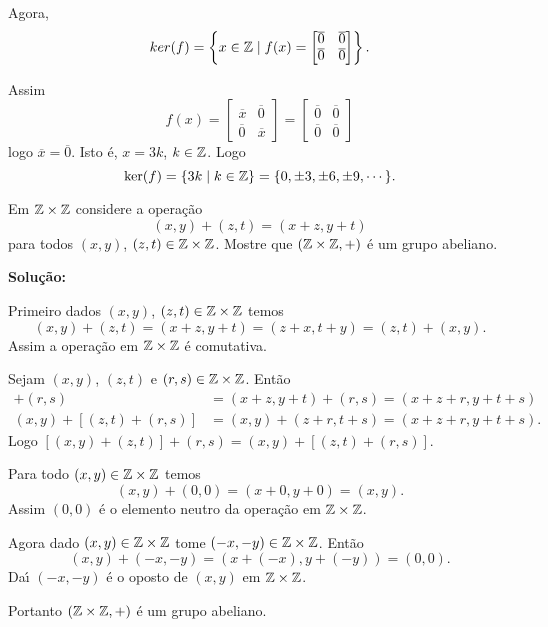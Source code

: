 \documentclass[12pt]{exam}
\begin{document}
Agora,
\[
	ker(f) = \left\{x \in \mathbb{Z} \mid f(x) = \begin{bmatrix}
		\overline{0} & \overline{0}\\
		\overline{0} & \overline{0}
	\end{bmatrix}\right\}.
\]

Assim
\[
	f(x) = \begin{bmatrix}
		\overline{x} & \overline{0}\\
		\overline{0} & \overline{x}
	\end{bmatrix} = \begin{bmatrix}
		\overline{0} & \overline{0}\\
		\overline{0} & \overline{0}
	\end{bmatrix}
\]
logo $\overline{x} = \overline{0}$. Isto \'e, $x = 3k$, $k \in \mathbb{Z}$. Logo 
\[
	\ker(f) = \{3k \mid k \in \mathbb{Z}\} = \{0, \pm 3, \pm 6, \pm 9, \cdots\}.
\]

\vspace{1cm}

\questao{} Em $\mathbb{Z} \times\mathbb{Z}$ considere a opera\c{c}\~ao
\[
	(x, y) + (z, t) = (x + z, y + t)
\]
para todos $(x,y)$, $(z,t) \in \mathbb{Z}\times\mathbb{Z}$. Mostre que $(\mathbb{Z}\times\mathbb{Z}, +)$ \'e um grupo abeliano.

\noindent\textbf{Solu\c{c}\~ao:}

Primeiro dados $(x,y)$, $(z,t) \in \mathbb{Z}\times\mathbb{Z}$ temos
\[
	(x,y) + (z,t) = (x+z,y+t) = (z+x,t+y) = (z,t) + (x,y).
\]
Assim a opera\c{c}\~ao em $\mathbb{Z}\times\mathbb{Z}$ \'e comutativa.

Sejam $(x,y)$, $(z,t)$ e $(r,s) \in \mathbb{Z}\times\mathbb{Z}$. Ent\~ao
\begin{align*}
	[(x,y) + (z,t)] + (r,s) &= (x + z, y+t) + (r,s) = (x+z+r,y+t+s)\\
	(x,y) + [(z,t)+(r,s)] &= (x,y) + (z+r,t+s) = (x+z+r,y+t+s).
\end{align*}
Logo $[(x,y)+(z,t)] + (r,s) = (x,y) + [(z,t) + (r,s)]$.

Para todo $(x,y) \in \mathbb{Z}\times\mathbb{Z}$ temos
\[
	(x,y) + (0,0) = (x+0,y+0) = (x,y).
\]
Assim $(0,0)$ \'e o elemento neutro da opera\c{c}\~ao em $\mathbb{Z}\times\mathbb{Z}$.

Agora dado $(x,y) \in \mathbb{Z}\times\mathbb{Z}$ tome $(-x,-y) \in \mathbb{Z}\times\mathbb{Z}$. Ent\~ao
\[
	(x,y) + (-x,-y) = (x+(-x),y+(-y)) = (0,0).
\]
Da{\'\i} $(-x,-y)$ \'e o oposto de $(x,y)$ em $\mathbb{Z}\times\mathbb{Z}$.

Portanto $(\mathbb{Z}\times\mathbb{Z},+)$ \'e um grupo abeliano.
\end{document}
